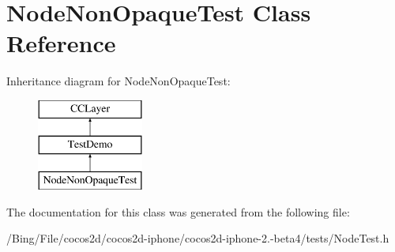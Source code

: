 \hypertarget{interface_node_non_opaque_test}{\section{Node\-Non\-Opaque\-Test Class Reference}
\label{interface_node_non_opaque_test}
}
Inheritance diagram for Node\-Non\-Opaque\-Test\-:\begin{figure}[H]
\begin{center}
\leavevmode
\includegraphics[height=3.000000cm]{interface_node_non_opaque_test}
\end{center}
\end{figure}


The documentation for this class was generated from the following file\-:\begin{DoxyCompactItemize}
\item 
/\-Bing/\-File/cocos2d/cocos2d-\/iphone/cocos2d-\/iphone-\/2.-\/beta4/tests/Node\-Test.\-h\end{DoxyCompactItemize}
